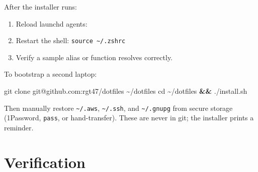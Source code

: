 \documentclass[
  11pt,
  letterpaper,
  DIV=11,
  numbers=noendperiod]{scrartcl}
\newenvironment{Shaded}{\begin{snugshade}}{\end{snugshade}}
\newcommand{\AttributeTok}[1]{\textcolor[rgb]{0.40,0.45,0.13}{#1}}
\newcommand{\BuiltInTok}[1]{\textcolor[rgb]{0.00,0.23,0.31}{#1}}
\newcommand{\CommentTok}[1]{\textcolor[rgb]{0.37,0.37,0.37}{#1}}
\newcommand{\DataTypeTok}[1]{\textcolor[rgb]{0.68,0.00,0.00}{#1}}
\newcommand{\ExtensionTok}[1]{\textcolor[rgb]{0.00,0.23,0.31}{#1}}
\newcommand{\FunctionTok}[1]{\textcolor[rgb]{0.28,0.35,0.67}{#1}}
\newcommand{\KeywordTok}[1]{\textcolor[rgb]{0.00,0.23,0.31}{\textbf{#1}}}
\newcommand{\NormalTok}[1]{\textcolor[rgb]{0.00,0.23,0.31}{#1}}
\newcommand{\PreprocessorTok}[1]{\textcolor[rgb]{0.68,0.00,0.00}{#1}}
\newcommand{\StringTok}[1]{\textcolor[rgb]{0.13,0.47,0.30}{#1}}
\newcommand{\VariableTok}[1]{\textcolor[rgb]{0.07,0.07,0.07}{#1}}
\begin{document}
After the installer runs:

\begin{enumerate}
\def\labelenumi{\arabic{enumi}.}
\item
  Reload launchd agents:

\begin{Shaded}
\end{Shaded}
\item
  Restart the shell: \texttt{source\ \textasciitilde{}/.zshrc}
\item
  Verify a sample alias or function resolves correctly.
\end{enumerate}

To bootstrap a second laptop:

\begin{Shaded}
\begin{Highlighting}[]
\FunctionTok{git}\NormalTok{ clone git@github.com:rgt47/dotfiles \textasciitilde{}/dotfiles}
\BuiltInTok{cd}\NormalTok{ \textasciitilde{}/dotfiles }\KeywordTok{\&\&} \ExtensionTok{./install.sh}
\end{Highlighting}
\end{Shaded}

Then manually restore \texttt{\textasciitilde{}/.aws},
\texttt{\textasciitilde{}/.ssh}, and \texttt{\textasciitilde{}/.gnupg}
from secure storage (1Password, \texttt{pass}, or hand-transfer). These
are never in git; the installer prints a reminder.

\section{Verification}\label{verification}

\begin{Shaded}
\end{Shaded}
\end{document}
